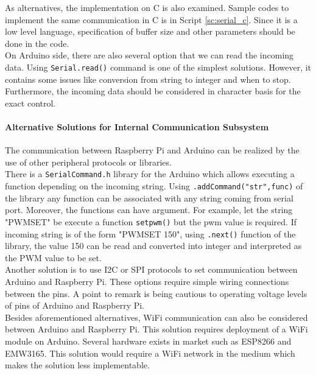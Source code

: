 \documentclass[a4paper,12pt]{article}
\begin{document}
	
	As alternatives, the implementation on C is also examined.	Sample codes to implement the same communication in C is in Script \ref{sc:serial_c}. Since it is a low level language, specification of buffer size and other parameters should be done in the code.\\

	On Arduino  side, there are also several option that we can read the incoming data. Using \texttt{Serial.read()}  command is one of the simplest solutions. However, it contains some issues like conversion from string to integer and when to stop. Furthermore, the incoming data should be considered in character basis for the exact control.  
	
	\paragraph{Alternative Solutions for Internal Communication Subsystem}
		The communication between Raspberry Pi and Arduino can be realized by the use of other peripheral protocols or libraries.\\
	
		There is a \texttt{SerialCommand.h} library for the Arduino which allows executing a function depending on the incoming string. Using \lstinline|.addCommand("str",func)| of the library any function can be associated with any string coming from serial port. Moreover, the functions can have argument. For example, let the string "PWMSET" be execute a function \lstinline|setpwm()| but the pwm value is required. If incoming string is of the form "PWMSET 150", using \lstinline|.next()| function of the library, the value 150 can be read and converted into integer and interpreted as the PWM value to be set.\\
		
		Another solution is to use I2C or SPI protocols to set communication between Arduino and Raspberry Pi. These options require simple wiring connections between the pins. A point to remark is being cautious to operating voltage levels of pins of Arduino and Raspberry Pi.\\
		
		Besides aforementioned alternatives, WiFi communication can also be considered between Arduino and Raspberry Pi. This solution requires deployment of a WiFi module on Arduino. Several hardware exists in market such as ESP8266 and EMW3165. This solution would require a WiFi network in the medium which makes the solution less implementable.\\
		
\end{document}
